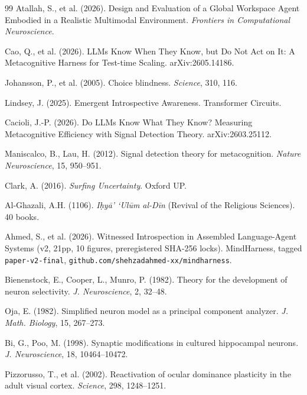 \documentclass[11pt]{article}
\begin{document}
{\begin{thebibliography}{99}
Atallah, S., et al. (2026). Design and Evaluation of a Global Workspace Agent
Embodied in a Realistic Multimodal Environment.
\emph{Frontiers in Computational Neuroscience}.

Cao, Q., et al. (2026). LLMs Know When They Know, but Do Not Act on It:
A Metacognitive Harness for Test-time Scaling. arXiv:2605.14186.

Johansson, P., et al. (2005). Choice blindness. \emph{Science}, 310, 116.

Lindsey, J. (2025). Emergent Introspective Awareness. Transformer Circuits.

Cacioli, J.-P. (2026). Do LLMs Know What They Know? Measuring Metacognitive
Efficiency with Signal Detection Theory. arXiv:2603.25112.

Maniscalco, B., Lau, H. (2012). Signal detection theory for metacognition. \emph{Nature Neuroscience}, 15, 950--951.

Clark, A. (2016). \emph{Surfing Uncertainty}. Oxford UP.

Al-Ghazali, A.H. (1106). \emph{I\d{h}y\=a' `Ul\=um al-D\=in} (Revival of the Religious Sciences). 40 books.

Ahmed, S., et al. (2026). Witnessed Introspection in Assembled Language-Agent Systems (v2, 21pp, 10 figures, preregistered SHA-256 locks). MindHarness, tagged \texttt{paper-\allowbreak{}v2-\allowbreak{}final}, \texttt{github.com/\allowbreak{}shehzadahmed-\allowbreak{}xx/\allowbreak{}mindharness}.

Bienenstock, E., Cooper, L., Munro, P. (1982). Theory for the development of neuron selectivity. \emph{J. Neuroscience}, 2, 32--48.

Oja, E. (1982). Simplified neuron model as a principal component analyzer. \emph{J. Math. Biology}, 15, 267--273.

Bi, G., Poo, M. (1998). Synaptic modifications in cultured hippocampal neurons. \emph{J. Neuroscience}, 18, 10464--10472.

Pizzorusso, T., et al. (2002). Reactivation of ocular dominance plasticity in the adult visual cortex. \emph{Science}, 298, 1248--1251.


\end{thebibliography}}
\end{document}

